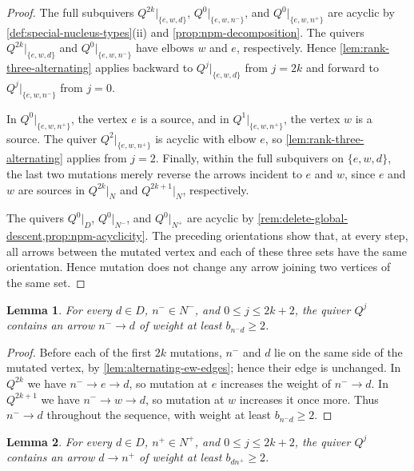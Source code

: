 \documentclass[10pt,a4paper]{amsart}
\newtheorem{lemma}[lemma]{Lemma}
\theoremstyle{definition}
\theoremstyle{definition}
\numberwithin{equation}{section}
\numberwithin{table}{section}
\newcommand{\nminus}{N^{-}}
\newcommand{\nplus}{N^{+}}
\newcommand{\Qalt}[1]{Q^{#1}}
\begin{document}
\begin{proof}
The full subquivers $\Qalt{2k}|_{\{e,w,d\}}$,
$\Qalt{0}|_{\{e,w,n^-\}}$, and $\Qalt{0}|_{\{e,w,n^+\}}$ are acyclic by
\cref{def:special-nucleus-types}\textup{(ii)} and
\cref{prop:npm-decomposition}. The quivers
$\Qalt{2k}|_{\{e,w,d\}}$ and
$\Qalt{0}|_{\{e,w,n^-\}}$ have elbows $w$ and $e$, respectively. Hence
\cref{lem:rank-three-alternating} applies backward to
$\Qalt{j}|_{\{e,w,d\}}$ from $j=2k$ and forward to
$\Qalt{j}|_{\{e,w,n^-\}}$ from $j=0$.

In $\Qalt{0}|_{\{e,w,n^+\}}$, the vertex $e$ is a source, and in
$\Qalt{1}|_{\{e,w,n^+\}}$, the vertex $w$ is a source. The quiver
$\Qalt{2}|_{\{e,w,n^+\}}$ is acyclic with elbow $e$, so
\cref{lem:rank-three-alternating} applies from $j=2$. Finally, within the
full subquivers on $\{e,w,d\}$, the last two mutations merely reverse the
arrows incident to $e$ and $w$, since $e$ and $w$ are sources in
$\Qalt{2k}|_N$ and $\Qalt{2k+1}|_N$, respectively.

The quivers $\Qalt{0}|_D$, $\Qalt{0}|_{\nminus}$, and
$\Qalt{0}|_{\nplus}$ are acyclic by
\cref{rem:delete-global-descent,prop:npm-acyclicity}. The preceding orientations
show that, at every step, all arrows between the mutated vertex and each of
these three sets have the same orientation. Hence mutation does not change
any arrow joining two vertices of the same set.
\end{proof}

\begin{lemma}\label{lem:alternating-d-nminus}
For every $d\in D$, $n^-\in\nminus$, and $0\le j\le2k+2$, the quiver
$\Qalt{j}$ contains an arrow $n^-\to d$ of weight at least
$b_{n^-d}\ge2$.
\end{lemma}

\begin{proof}
Before each of the first $2k$ mutations, $n^-$ and $d$ lie on the same
side of the mutated vertex, by \cref{lem:alternating-ew-edges}; hence their
edge is unchanged. In $\Qalt{2k}$ we have $n^-\to e\to d$, so mutation at
$e$ increases the weight of $n^-\to d$. In $\Qalt{2k+1}$ we have
$n^-\to w\to d$, so mutation at $w$ increases it once more. Thus
$n^-\to d$ throughout the sequence, with weight at least $b_{n^-d}\ge2$.
\end{proof}

\begin{lemma}\label{lem:alternating-d-nplus}
For every $d\in D$, $n^+\in\nplus$, and $0\le j\le2k+2$, the quiver
$\Qalt{j}$ contains an arrow $d\to n^+$ of weight at least
$b_{dn^+}\ge2$.
\end{lemma}
\end{document}
